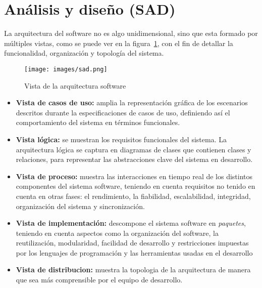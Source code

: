 
\section{Análisis y diseño (SAD)}

La arquitectura del software no es algo unidimensional, sino que esta formado 
por múltiples vistas, como se puede ver en la figura~\ref{fig:sad}, con el 
fin de detallar la funcionalidad, organización y topología del sistema.

\begin{figure}[hp]
	\centering
	\texttt{[image: images/sad.png]}
	\caption{Vista de la arquitectura software}
	\label{fig:sad}
\end{figure}

\begin{itemize}
  \item \textbf{Vista de casos de uso:} amplia la representación gráfica 
	de los escenarios descritos durante la especificaciones de casos 
	de uso, definiendo así el comportamiento del sistema en términos 
	funcionales.
  \item \textbf{Vista lógica:} se muestran los requisitos funcionales 
	del sistema. La arquitectura lógica se captura en diagramas de clases 
	que contienen clases y relaciones, para representar las abstracciones 
	clave del sistema en desarrollo.
  \item \textbf{Vista de proceso:} muestra las interacciones en tiempo real de
	los distintos componentes del sistema software, teniendo en cuenta
	requisitos no tenido en cuenta en otras fases: el rendimiento, la 
	fiabilidad, escalabilidad, integridad, organización del sistema y 
	sincronización. 
  \item \textbf{Vista de implementación:} descompone el sistema software en
	\emph{paquetes}, teniendo en cuenta aspectos como la organización del 
	software, la reutilización, modularidad, facilidad de desarrollo y 
	restricciones impuestas por los lenguajes de programación y las 
	herramientas usadas en el desarrollo
  \item \textbf{Vista de distribucion:} muestra la topologia de la arquitectura
	de manera que sea más comprensible por el equipo de desarrollo.
\end{itemize}













